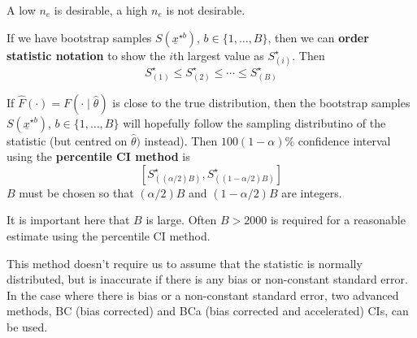 \begin{remark}
	A low $n_e$ is desirable, a high $n_e$ is not desirable.
\end{remark}

\begin{definition}
	If we have bootstrap samples $S(\underline{x}^{\star b})$, $b \in \{ 1, \dots, B \}$, then we can \textbf{order statistic notation} to show the $i$th largest value as $S_{(i)}^{\star}$. Then
	\[
		S_{(1)}^{\star} \le S_{(2)}^{\star} \le \cdots \le S_{(B)}^{\star}
	\]
\end{definition}

\begin{definition}
	If $\hat{F}(\cdot) = F(\cdot \mid \hat{\theta})$ is close to the true distribution, then the bootstrap samples $S(\underline{x}^{\star b})$, $b \in \{ 1, \dots, B \}$ will hopefully follow the sampling distributino of the statistic (but centred on $\hat{\theta})$ instead). Then $100(1 - \alpha)\%$ confidence interval using the \textbf{percentile CI method} is
	\[
		\left[ S_{((\alpha / 2) B)}^{\star}, S_{((1 - \alpha / 2) B)}^{\star} \right]
	\]
	$B$ must be chosen so that $(\alpha / 2) B$ and $(1 - \alpha / 2) B$ are integers.
\end{definition}

\begin{remark}
	It is important here that $B$ is large. Often $B > 2000$ is required for a reasonable estimate using the percentile CI method.
\end{remark}

\begin{remark}
	This method doesn't require us to assume that the statistic is normally distributed, but is inaccurate if there is any bias or non-constant standard error. In the case where there is bias or a non-constant standard error, two advanced methods, BC (bias corrected) and BCa (bias corrected and accelerated) CIs, can be used.
\end{remark}

